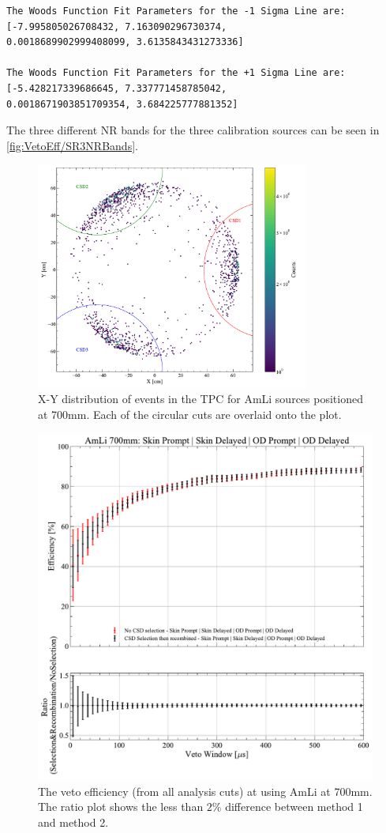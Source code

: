 \begin{enumerate}
\begin{lstlisting}[backgroundcolor = \color{lightgray}]
The Woods Function Fit Parameters for the -1 Sigma Line are:
[-7.995805026708432, 7.163090296730374,
0.0018689902999408099, 3.6135843431273336]

The Woods Function Fit Parameters for the +1 Sigma Line are:
[-5.428217339686645, 7.337771458785042,
0.0018671903851709354, 3.684225777881352]
\end{lstlisting}
The three different NR bands for the three calibration sources can be seen in \autoref{fig:VetoEff/SR3NRBands}.
\end{enumerate}

\begin{figure}[!ht]
	\centering
	\includegraphics[width=0.8\textwidth]{figures/VetoEfficiency/CircularCSDCut.pdf}
	\caption{X-Y distribution of events in the TPC for AmLi sources positioned at 700mm. Each of the circular cuts are overlaid onto the plot.}
	\label{fig:VetoEff/CSDSelection}
\end{figure}
\begin{figure}[!ht]
	\centering
	\includegraphics[width=0.8\linewidth]{figures/VetoEfficiency/AmLi_700mm_Total_CSDSelection.pdf}
	\caption{The veto efficiency (from all analysis cuts) at using AmLi at 700mm. The ratio plot shows the less than $2\%$ difference between method 1 and method 2.}
	\label{fig:VetoEff/CSDSelectionEffComp}
\end{figure}

